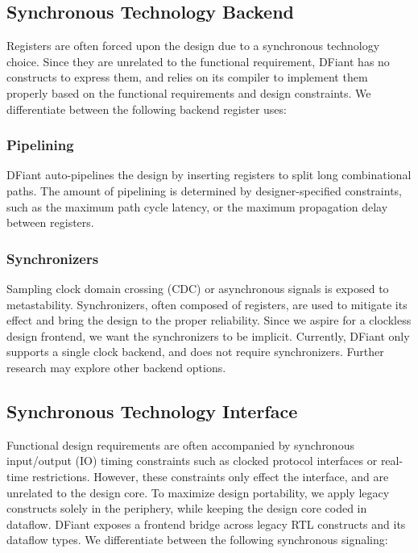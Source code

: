 
\subsection{Synchronous Technology Backend}
Registers are often forced upon the design due to a synchronous technology choice. Since they are unrelated to the functional requirement, DFiant has no constructs to express them, and relies on its compiler to implement them properly based on the functional requirements and design constraints.
We differentiate between the following backend register uses:
\subsubsection{Pipelining}
DFiant auto-pipelines the design by inserting registers to split long combinational paths. The amount of pipelining is determined by designer-specified constraints, such as the maximum path cycle latency, or the maximum propagation delay between registers.
\subsubsection{Synchronizers}
Sampling clock domain crossing (CDC) or asynchronous signals is exposed to metastability. Synchronizers, often composed of registers, are used to mitigate its effect and bring the design to the proper reliability. Since we aspire for a clockless design frontend, we want the synchronizers to be implicit. Currently, DFiant only supports a single clock backend, and does not require synchronizers. Further research may explore other backend options.

\subsection{Synchronous Technology Interface}
Functional design requirements are often accompanied by synchronous input/output (IO) timing constraints such as clocked protocol interfaces or real-time restrictions. However, these constraints only effect the interface, and are unrelated to the design core. To maximize design portability, we apply legacy constructs solely in the periphery, while keeping the design core coded in dataflow. DFiant exposes a frontend bridge across legacy RTL constructs and its dataflow types. We differentiate between the following synchronous signaling:
